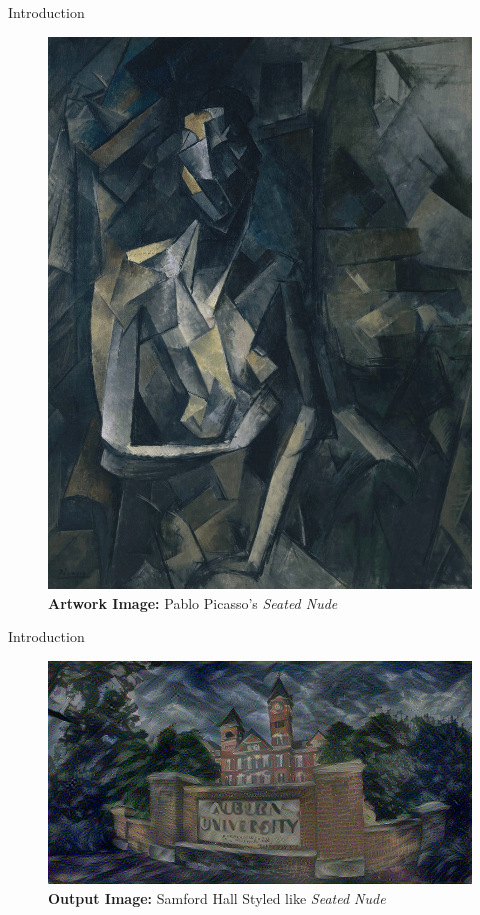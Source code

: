 \documentclass{beamer}
\begin{document}
\begin{frame}{Introduction}
\begin{figure}[ht]
\centering
\includegraphics[height=0.7\textheight]{img/artworks/seated-nude}
\caption*{\textbf{Artwork Image:} Pablo Picasso's \textit{Seated Nude}}
\end{figure}
\end{frame}



\begin{frame}{Introduction}
\begin{figure}[ht]
\centering
\includegraphics[width=\textwidth]{img/loss/Adam.png}
\caption*{\textbf{Output Image:} Samford Hall Styled like \textit{Seated Nude}}
\end{figure}
\end{frame}
\end{document}
